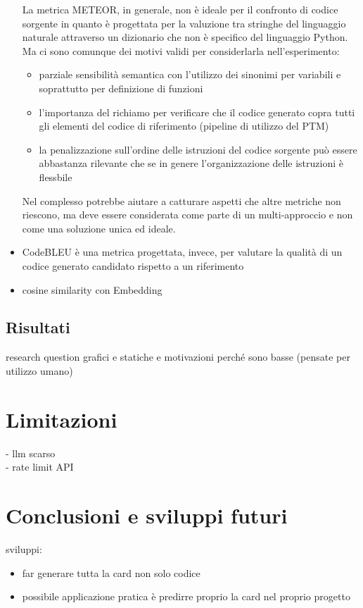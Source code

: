 \documentclass{article}
\begin{document}
\begin{itemize}
    La metrica METEOR, in generale, non è ideale per il confronto di codice sorgente in quanto è progettata per la valuzione tra stringhe del linguaggio naturale attraverso un dizionario che non è specifico del linguaggio Python. Ma ci sono comunque dei motivi validi per considerlarla nell'esperimento:
    \begin{itemize}
        \item parziale sensibilità semantica con l'utilizzo dei sinonimi per variabili e soprattutto per definizione di funzioni
        \item l'importanza del richiamo per verificare che il codice generato copra tutti gli elementi del codice di riferimento (pipeline di utilizzo del PTM)
        \item la penalizzazione sull'ordine delle istruzioni del codice sorgente può essere abbastanza rilevante che se in genere l'organizzazione delle istruzioni è flessbile
    \end{itemize}
    Nel complesso potrebbe aiutare a catturare aspetti che altre metriche non riescono, ma deve essere considerata come parte di un multi-approccio e non come una soluzione unica ed ideale.
    
    \item CodeBLEU \cite{ren2020codebleumethodautomaticevaluation} è una metrica progettata, invece, per valutare la qualità di un codice generato candidato rispetto a un riferimento
    \item cosine similarity con Embedding
\end{itemize}


\subsection{Risultati}
research question
grafici e statiche e motivazioni perché sono basse (pensate per utilizzo umano)


\section{Limitazioni}
- llm scarso\\
- rate limit API


\section{Conclusioni e sviluppi futuri}
sviluppi:
\begin{itemize}
    \item far generare tutta la card non solo codice
    \item possibile applicazione pratica è predirre proprio la card nel proprio progetto
\end{itemize}



\appendix
\end{document}
